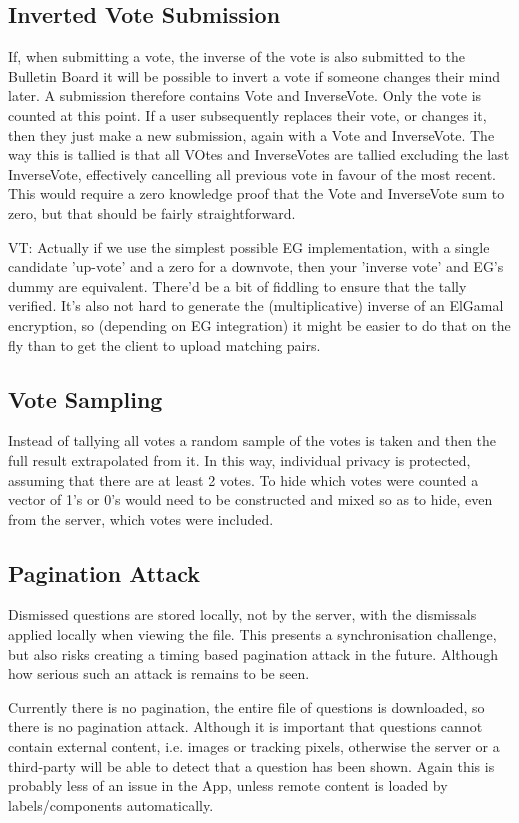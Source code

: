 \documentclass[10pt,a4paper]{article}
\begin{document}
\subsection{Inverted Vote Submission}
If, when submitting a vote, the inverse of the vote is also submitted to the Bulletin Board it will be possible to invert a vote if someone changes their mind later. A submission therefore contains Vote and InverseVote. Only the vote is counted at this point. If a user subsequently replaces their vote, or changes it, then they just make a new submission, again with a Vote and InverseVote. The way this is tallied is that all VOtes and InverseVotes are tallied excluding the last InverseVote, effectively cancelling all previous vote in favour of the most recent. This would require a zero knowledge proof that the Vote and InverseVote sum to zero, but that should be fairly straightforward.

VT: Actually if we use the simplest possible EG implementation, with a single candidate 'up-vote' and a zero for a downvote, then your 'inverse vote' and EG's dummy are equivalent. There'd be a bit of fiddling to ensure that the tally verified. It's also not hard to generate the (multiplicative) inverse of an ElGamal encryption, so (depending on EG integration) it might be easier to do that on the fly than to get the client to upload matching pairs.

\subsection{Vote Sampling}
Instead of tallying all votes a random sample of the votes is taken and then the full result extrapolated from it. In this way, individual privacy is protected, assuming that there are at least 2 votes. To hide which votes were counted a vector of 1's or 0's would need to be constructed and mixed so as to hide, even from the server, which votes were included.

\subsection{Pagination Attack}
Dismissed questions are stored locally, not by the server, with the dismissals applied locally when viewing the file. This presents a synchronisation challenge, but also risks creating a timing based pagination attack in the future. Although how serious such an attack is remains to be seen.

Currently there is no pagination, the entire file of questions is downloaded, so there is no pagination attack. Although it is important that questions cannot contain external content, i.e. images or tracking pixels, otherwise the server or a third-party will be able to detect that a question has been shown. Again this is probably less of an issue in the App, unless remote content is loaded by labels/components automatically.
\end{document}
